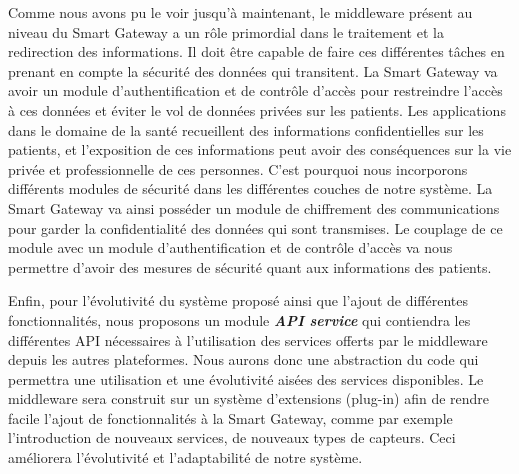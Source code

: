 Comme nous avons pu le voir jusqu’à maintenant, le middleware présent au niveau du Smart Gateway a un rôle primordial dans le traitement et la redirection des informations. Il doit être capable de faire ces différentes tâches en prenant en compte la sécurité des données qui transitent. La Smart Gateway va avoir un module d’authentification et de contrôle d’accès pour restreindre l’accès à ces données et éviter le vol de données privées sur les patients. Les applications dans le domaine de la santé recueillent des informations confidentielles sur les patients, et l’exposition de ces informations peut avoir des conséquences sur la vie privée et professionnelle de ces personnes. C’est pourquoi nous incorporons différents modules de sécurité dans les différentes couches de notre système. La Smart Gateway va ainsi posséder un module de chiffrement des communications pour garder la confidentialité des données qui sont transmises. Le couplage de ce module avec un module d’authentification et de contrôle d’accès va nous permettre d’avoir des mesures de sécurité quant aux informations des patients.

Enfin, pour l’évolutivité du système proposé ainsi que l’ajout de différentes fonctionnalités, nous proposons un module \textbf{\textit{API service}} qui contiendra les différentes API nécessaires à l'utilisation des services offerts par le middleware depuis les autres plateformes. Nous aurons donc une abstraction du code qui permettra une utilisation et une évolutivité aisées des services disponibles.
Le middleware sera construit sur un système d'extensions (plug-in) afin de rendre facile l’ajout de fonctionnalités à la Smart Gateway, comme par exemple l’introduction de nouveaux services, de nouveaux types de capteurs. Ceci améliorera l'évolutivité et l'adaptabilité de notre système.

